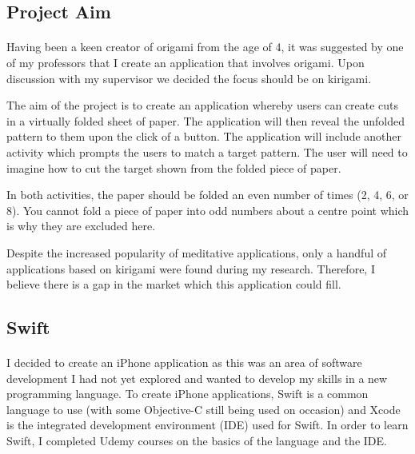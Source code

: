 \documentclass[11pt]{article}
\begin{document}
            \subsection{Project Aim}
            
                 \paragraph{} 
                 
                  Having been a keen creator of origami from the age of 4, it was suggested by one of my professors that I create an application that involves origami. Upon discussion with my supervisor we decided the focus should be on kirigami. 
                  
                  The aim of the project is to create an application whereby users can create cuts in a virtually folded sheet of paper. The application will then reveal the unfolded pattern to them upon the click of a button. The application will include another activity which prompts the users to match a target pattern. The user will need to imagine how to cut the target shown from the folded piece of paper.
                  
                  In both activities, the paper should be folded an even number of times (2, 4, 6, or 8). You cannot fold a piece of paper into odd numbers about a centre point which is why they are excluded here.
                  
                  Despite the increased popularity of meditative applications, only a handful of applications based on kirigami were found during my research. Therefore, I believe there is a gap in the market which this application could fill.


                  \subsection{Swift}
               
                \paragraph{} 
                    I decided to create an iPhone application as this was an area of software development I had not yet explored and wanted to develop my skills in a new programming language. To create iPhone applications, Swift is a common language to use (with some Objective-C still being used on occasion) and Xcode is the integrated development environment (IDE) used for Swift. In order to learn Swift, I completed Udemy courses \cite{Udemy} on the basics of the language and the IDE. 
                   
\end{document}
